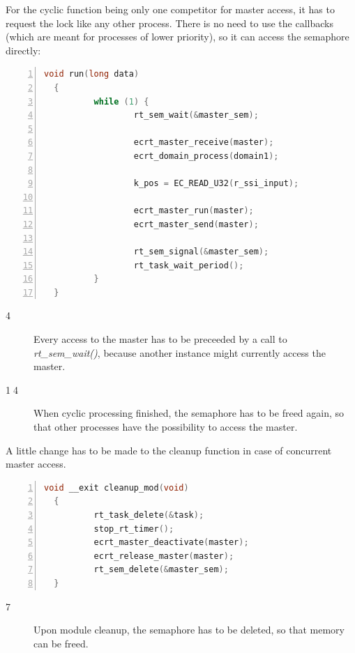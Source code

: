 \documentclass[a4paper,12pt,BCOR6mm,bibtotoc,idxtotoc]{scrbook}
\begin{document}
For the cyclic function being only one competitor for master access,
it has to request the lock like any other process. There is no need to
use the callbacks (which are meant for processes of lower priority),
so it can access the semaphore directly:

\begin{lstlisting}[language=C,numbers=left,caption={RTAI cyclic
    function for concurrent access},label={lst:conrun}]
  void run(long data)
  {
          while (1) {
                  rt_sem_wait(&master_sem);

                  ecrt_master_receive(master);
                  ecrt_domain_process(domain1);

                  k_pos = EC_READ_U32(r_ssi_input);

                  ecrt_master_run(master);
                  ecrt_master_send(master);

                  rt_sem_signal(&master_sem);
                  rt_task_wait_period();
          }
  }
\end{lstlisting}

\begin{description}
\item[\normalfont\textcircled{\tiny 4}] Every access to the master has
  to be preceeded by a call to \textit{rt\_sem\_wait()}, because
  another instance might currently access the master.
\item[\normalfont\textcircled{\tiny 14}] When cyclic processing
  finished, the semaphore has to be freed again, so that other
  processes have the possibility to access the master.
\end{description}

A little change has to be made to the cleanup function in case of
concurrent master access.

\begin{lstlisting}[language=C,numbers=left,caption={RTAI module
    cleanup function for concurrent access},label={lst:conclean}]
  void __exit cleanup_mod(void)
  {
          rt_task_delete(&task);
          stop_rt_timer();
          ecrt_master_deactivate(master);
          ecrt_release_master(master);
          rt_sem_delete(&master_sem);
  }
\end{lstlisting}

\begin{description}
\item[\normalfont\textcircled{\tiny 7}] Upon module cleanup, the
  semaphore has to be deleted, so that memory can be freed.
\end{description}
\end{document}
